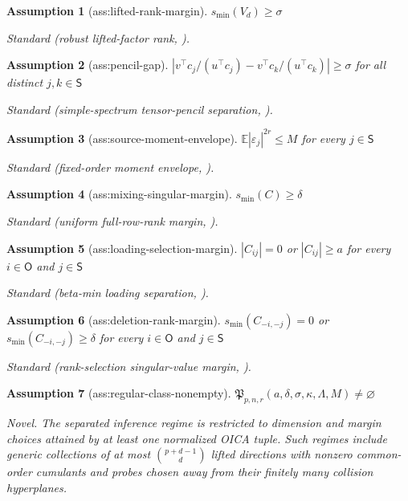 \documentclass{article}
\newtheorem{assumption}{Assumption}
\begin{document}
\begin{assumption}[ass:lifted-rank-margin]\label{ass:lifted-rank-margin}
\(s_{\min}(V_d)\ge\sigma\)
\par\smallskip\noindent\emph{Standard} (robust lifted-factor rank, \cite{WangSeigal2026}).
\end{assumption}

\begin{assumption}[ass:pencil-gap]\label{ass:pencil-gap}
\(\left|v^\top c_j/(u^\top c_j)-v^\top c_k/(u^\top c_k)\right|\ge\sigma\) for all distinct \(j,k\in\mathsf S\)
\par\smallskip\noindent\emph{Standard} (simple-spectrum tensor-pencil separation, \cite{AnandkumarGeJanzamin2015}).
\end{assumption}

\begin{assumption}[ass:source-moment-envelope]\label{ass:source-moment-envelope}
\(\mathbb E|\varepsilon_j|^{2r}\le M\) for every \(j\in\mathsf S\)
\par\smallskip\noindent\emph{Standard} (fixed-order moment envelope, \cite{AnandkumarGeJanzamin2015}).
\end{assumption}

\begin{assumption}[ass:mixing-singular-margin]\label{ass:mixing-singular-margin}
\(s_{\min}(C)\ge\delta\)
\par\smallskip\noindent\emph{Standard} (uniform full-row-rank margin, \cite{WangSeigal2026}).
\end{assumption}

\begin{assumption}[ass:loading-selection-margin]\label{ass:loading-selection-margin}
\(|C_{ij}|=0\) or \( |C_{ij}|\ge a\) for every \(i\in\mathsf O\) and \(j\in\mathsf S\)
\par\smallskip\noindent\emph{Standard} (beta-min loading separation, \cite{AnandkumarGeJanzamin2015}).
\end{assumption}

\begin{assumption}[ass:deletion-rank-margin]\label{ass:deletion-rank-margin}
\(s_{\min}(C_{-i,-j})=0\) or \(s_{\min}(C_{-i,-j})\ge\delta\) for every \(i\in\mathsf O\) and \(j\in\mathsf S\)
\par\smallskip\noindent\emph{Standard} (rank-selection singular-value margin, \cite{WangSeigal2026}).
\end{assumption}

\begin{assumption}[ass:regular-class-nonempty]\label{ass:regular-class-nonempty}
\(\mathfrak P_{p,n,r}(a,\delta,\sigma,\kappa,\Lambda,M)\ne\varnothing\)
\par\smallskip\noindent\emph{Novel.} The separated inference regime is restricted to dimension and margin choices attained by at least one normalized OICA tuple. Such regimes include generic collections of at most \(\binom{p+d-1}{d}\) lifted directions with nonzero common-order cumulants and probes chosen away from their finitely many collision hyperplanes.
\end{assumption}
\end{document}
